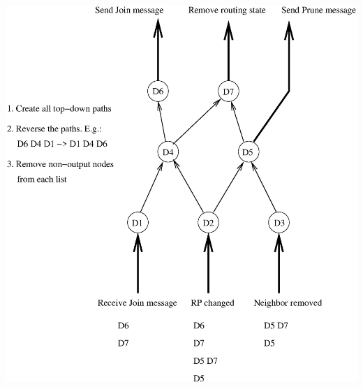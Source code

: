 \documentclass[landscape]{icsislides}
\begin{document}
\begin{slide}

\begin{center}
  \includegraphics[scale=0.55]{figs/pim_state_dependency4}
\end{center}

\end{slide}
\end{document}
